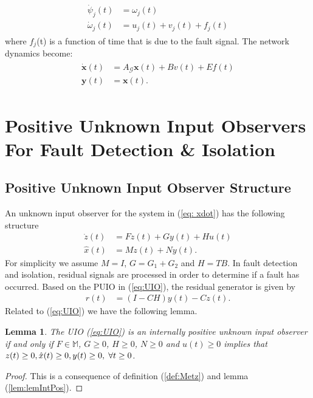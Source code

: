 \documentclass[letterpaper, 10 pt, conference]{ieeeconf}  %
\newtheorem{lemma}{Lemma}
\def\mM{\mathbb{M}}
\def\cG{\mathcal{G}}
\def\gez{\geq 0}
\begin{document}
\begin{gather} 
\begin{aligned} \label{eq:agentConsFaultAct}
\dot{\psi}_j(t) &= \omega_j(t) \\
\dot{\omega}_j (t) &= u_j (t) + v_j (t) +f_j (t) \nonumber
\end{aligned}
\end{gather}
where $f_j$(t) is a function of time that is due to the fault signal. The network dynamics become:
\begin{gather} \label{eq:globalDynActFault}
\begin{aligned} 
\dot{\mathbf{x}}(t) &= A_{\cG}\mathbf{x}(t)+Bv(t)+Ef(t) \\
\mathbf{y}(t) &= \mathbf{x}(t).
\end{aligned}
\end{gather}

\section{Positive Unknown Input Observers For Fault Detection \& Isolation} \label{sec:PUIO}
\subsection{Positive Unknown Input Observer Structure}
An unknown input observer for the system in (\ref{eq: xdot}) has the following structure
\begin{align} \label{eq:UIO}
\dot{z}(t) &= Fz(t) +Gy(t) +Hu(t) \\ 
\hat{x}(t) &= Mz(t) + Ny(t). \nonumber
\end{align}
For simplicity we assume $M=I$, $G = G_1 + G_2$ and $H=TB$. In fault detection and isolation, residual signals are processed in order to determine if a fault has occurred. Based on the PUIO in (\ref{eq:UIO}), the residual generator is given by
\begin{align}
r (t) &= (I - C H ) y (t) - C z (t). \label{eq:residual}
\end{align} 
Related to (\ref{eq:UIO}) we have the following lemma.
\begin{lemma} \label{lem:lemmaUIO}
The UIO (\ref{eq:UIO}) is an internally positive unknown input observer if and only if $F \in \mM$, $G \gez$, $H\gez$, $N \gez$ and $u(t) \gez$ implies that $z(t) \gez, \hat{x}(t) \gez, y(t) \gez, \hspace{1mm} \forall t\geq 0$. 
\end{lemma}
\begin{proof}
This is a consequence of definition (\ref{def:Metz}) and lemma (\ref{lem:lemIntPos}).
\end{proof}
\end{document}
